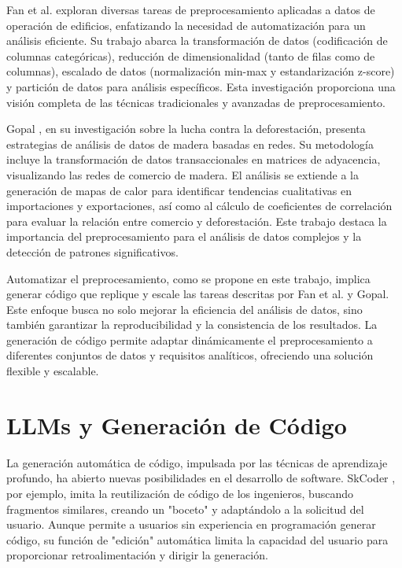 Fan et al. \cite{fan2021review} exploran diversas tareas de preprocesamiento aplicadas a datos de operación de edificios, enfatizando la necesidad de automatización para un análisis eficiente. Su trabajo abarca la transformación de datos (codificación de columnas categóricas), reducción de dimensionalidad (tanto de filas como de columnas), escalado de datos (normalización min-max y estandarización z-score) y partición de datos para análisis específicos. Esta investigación proporciona una visión completa de las técnicas tradicionales y avanzadas de preprocesamiento.

Gopal \cite{gopal2022network}, en su investigación sobre la lucha contra la deforestación, presenta estrategias de análisis de datos de madera basadas en redes. Su metodología incluye la transformación de datos transaccionales en matrices de adyacencia, visualizando las redes de comercio de madera. El análisis se extiende a la generación de mapas de calor para identificar tendencias cualitativas en importaciones y exportaciones, así como al cálculo de coeficientes de correlación para evaluar la relación entre comercio y deforestación. Este trabajo destaca la importancia del preprocesamiento para el análisis de datos complejos y la detección de patrones significativos.

Automatizar el preprocesamiento, como se propone en este trabajo, implica generar código que replique y escale las tareas descritas por Fan et al. y Gopal. Este enfoque busca no solo mejorar la eficiencia del análisis de datos, sino también garantizar la reproducibilidad y la consistencia de los resultados. La generación de código permite adaptar dinámicamente el preprocesamiento a diferentes conjuntos de datos y requisitos analíticos, ofreciendo una solución flexible y escalable.


\section{LLMs y Generación de Código}

La generación automática de código, impulsada por las técnicas de aprendizaje profundo, ha abierto nuevas posibilidades en el desarrollo de software. SkCoder \cite{li2023skcoder}, por ejemplo, imita la reutilización de código de los ingenieros, buscando fragmentos similares, creando un "boceto" y adaptándolo a la solicitud del usuario. Aunque permite a usuarios sin experiencia en programación generar código, su función de "edición" automática limita la capacidad del usuario para proporcionar retroalimentación y dirigir la generación.

